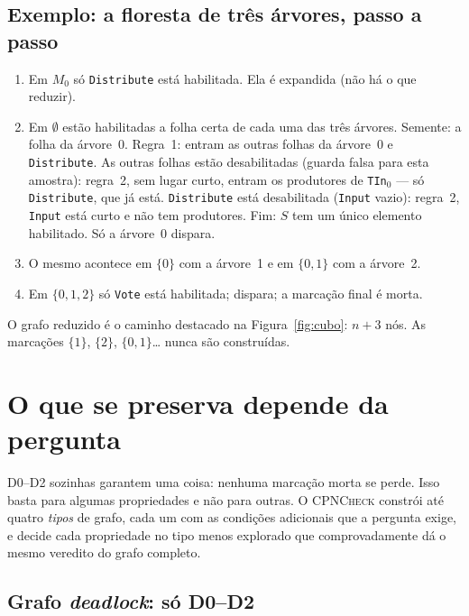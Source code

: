 \documentclass[11pt,a4paper]{report}
\newcommand{\cpn}{\textsc{CPNCheck}}
\newcommand{\code}[1]{\texttt{\small #1}}
\theoremstyle{definition}
\begin{document}
\section{Exemplo: a floresta de três árvores, passo a passo}

\begin{enumerate}[leftmargin=1.6em]
  \item Em $M_0$ só \code{Distribute} está habilitada. Ela é expandida (não há
        o que reduzir).
  \item Em $\emptyset$ estão habilitadas a folha certa de cada uma das três
        árvores. Semente: a folha da árvore~0. Regra~1: entram as outras folhas
        da árvore~0 e \code{Distribute}. As outras folhas estão desabilitadas
        (guarda falsa para esta amostra): regra~2, sem lugar curto, entram os
        produtores de \code{TIn}$_0$ --- só \code{Distribute}, que já está.
        \code{Distribute} está desabilitada (\code{Input} vazio): regra~2,
        \code{Input} está curto e não tem produtores. Fim: $S$ tem um único
        elemento habilitado. Só a árvore~0 dispara.
  \item O mesmo acontece em $\{0\}$ com a árvore~1 e em $\{0,1\}$ com a
        árvore~2.
  \item Em $\{0,1,2\}$ só \code{Vote} está habilitada; dispara; a marcação
        final é morta.
\end{enumerate}

O grafo reduzido é o caminho destacado na Figura~\ref{fig:cubo}: $n+3$ nós.
As marcações $\{1\}$, $\{2\}$, $\{0,1\}$\ldots{} nunca são construídas.

\chapter{O que se preserva depende da pergunta}
\label{cap:preserva}

D0--D2 sozinhas garantem uma coisa: nenhuma marcação morta se perde. Isso
basta para algumas propriedades e não para outras. O \cpn{} constrói até
quatro \emph{tipos} de grafo, cada um com as condições adicionais que a
pergunta exige, e decide cada propriedade no tipo menos explorado que
comprovadamente dá o mesmo veredito do grafo completo.

\section{Grafo \emph{deadlock}: só D0--D2}
\end{document}
